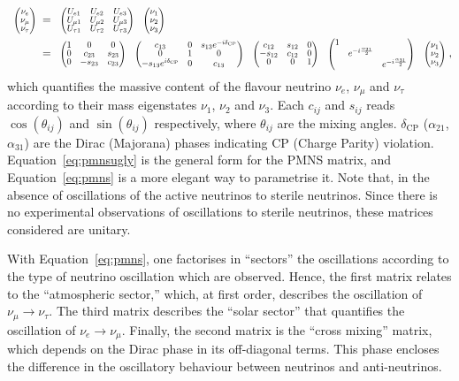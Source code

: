 \begin{align}
  \colvec{
    \nu_e    \\
    \nu_\mu  \\
    \nu_\tau
  }
  &= \colvec{
    U_{e1} & U_{e2} & U_{e3}\\
  U_{\mu1} &U_{\mu2}  &U_{\mu3}\\
  U_{\tau1} &U_{\tau2}  &U_{\tau3}
                          }
  \colvec{
    \nu_1 \\
    \nu_2 \\
    \nu_3
  } \label{eq:pmnsugly}\\
  &=
  \colvec{
    1 & 0       & 0     \\
    0 & c_{23}  & s_{23} \\
    0 & -s_{23} & c_{23}
  }
  \colvec{
    c_{13}               & 0 & s_{13}e^{-i \delta_{\text{CP}}} \\
    0                    & 1 & 0                      \\
    -s_{13}e^{i \delta_{\text{CP}}} & 0 & c_{13}
  }
  \colvec{
    c_{12}  & s_{12} & 0 \\
    -s_{12} & c_{12} & 0 \\
    0      & 0      & 1
  }
  \colvec{
    1 & & \\
    & e^{-i\frac{\alpha_{21}}{2}} &\\
    & & e^{-i\frac{\alpha_{31}}{2}}\\
  }
  \colvec{
    \nu_1 \\
    \nu_2 \\
    \nu_3
  }                ,
  \label{eq:pmns}
\end{align}
which quantifies the massive content of the flavour neutrino $\nu_e$,
$\nu_\mu$ and $\nu_\tau$ according to their mass eigenstates $\nu_1$,
$\nu_2$ and $\nu_3$. Each $c_{ij}$ and $s_{ij}$ reads
$\cos\left(\theta_{ij}\right)$ and $\sin\left(\theta_{ij}\right)$
respectively, where $\theta_{ij}$ are the mixing
angles. $\delta_{\text{CP}}$ ($\alpha_{21}$, $\alpha_{31}$) are the
Dirac (Majorana) phases indicating \Gls{CP} (Charge Parity) violation.
Equation~\ref{eq:pmnsugly} is the general form for the \Gls{PMNS}
matrix, and Equation~\ref{eq:pmns} is a more elegant way to
parametrise it. Note that, in the absence of oscillations of the
active neutrinos to sterile neutrinos. Since there is no experimental
observations of oscillations to sterile neutrinos, these matrices
considered are unitary.

With Equation~\ref{eq:pmns}, one factorises in ``sectors'' the
oscillations according to the type of neutrino oscillation which are
observed. Hence, the first matrix relates to the ``atmospheric
sector,'' which, at first order, describes the oscillation of
$\nu_\mu\rightarrow\nu_\tau$. The third matrix describes the ``solar
sector'' that quantifies the oscillation of
$\nu_e\rightarrow\nu_\mu$. Finally, the second matrix is the ``cross
mixing'' matrix, which depends on the Dirac phase in its off-diagonal
terms. This phase encloses the difference in the oscillatory behaviour
between neutrinos and anti-neutrinos.

